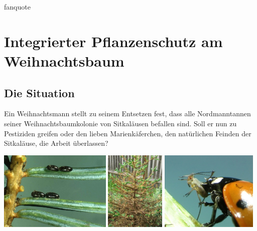 \documentclass[%
<<<<<<< Updated upstream
<<<<<<< Updated upstream
11pt,%
twoside,%
titlepage,%
german,%
headsepline%
]{scrartcl}
\begin{document}
\begin{uebenv}{fanquote}
\clearpage




\clearpage

\section{Integrierter Pflanzenschutz am Weihnachtsbaum}
\subsection{Die Situation}
Ein Weihnachtsmann stellt zu seinem Entsetzen fest, dass alle Nordmanntannen seiner Weihnachtsbaumkolonie von Sitkaläusen befallen sind. Soll er nun zu Pestiziden greifen oder den lieben Marienkäferchen, den natürlichen Feinden der Sitkaläuse, die Arbeit überlassen?
\\[2ex]

\begin{center}
\includegraphics[height=3.8cm]{pictures/sitkalauseier.jpg}
\includegraphics[height=3.8cm]{pictures/tannenbaum.jpg}
\includegraphics[height=3.8cm]{pictures/marienkaefer.jpg}
\end{center}


\end{uebenv}
\end{document}
